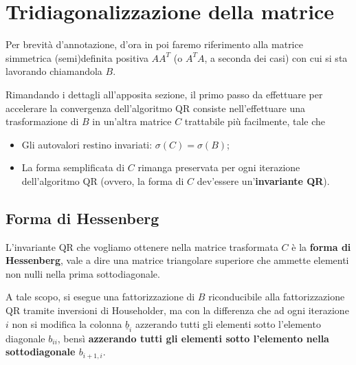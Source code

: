 \section{Tridiagonalizzazione della matrice}
Per brevità d'annotazione, d'ora in poi faremo riferimento alla matrice 
simmetrica (semi)definita positiva $A A^T$ (o $A^T A$, a seconda dei casi) con 
cui si sta lavorando chiamandola $B$.

Rimandando i dettagli all'apposita sezione, il primo passo da effettuare per 
accelerare la convergenza dell'algoritmo QR consiste nell'effettuare una 
trasformazione di $B$ in un'altra matrice $C$ trattabile più facilmente, tale 
che
\begin{itemize}
	\item Gli autovalori restino invariati: $\sigma(C) = \sigma(B)$;
	
	\item La forma semplificata di $C$ rimanga preservata per ogni iterazione 
dell'algoritmo QR (ovvero, la forma di $C$ dev'essere un'\textbf{invariante 
QR}).
\end{itemize}

\subsection{Forma di Hessenberg}
L'invariante QR che vogliamo ottenere nella matrice trasformata $C$ è la 
\textbf{forma di Hessenberg}, vale a dire una matrice triangolare superiore che 
ammette elementi non nulli nella prima sottodiagonale.

A tale scopo, si esegue una fattorizzazione di $B$ riconducibile alla 
fattorizzazione QR tramite inversioni di Householder, ma con la differenza che 
ad ogni iterazione $i$ non si modifica la colonna $\underline{b}_i$ azzerando 
tutti gli elementi sotto l'elemento diagonale $b_{ii}$, bensì \textbf{azzerando 
tutti gli elementi sotto l'elemento nella sottodiagonale $b_{i+1,i}$}.

